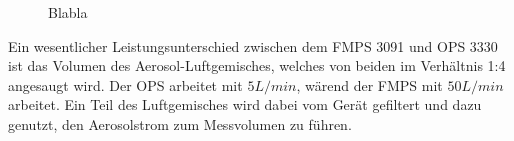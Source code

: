 \begin{figure}[H]
	\myfloatalign
	 \quad
	\caption[Blabla]
	{Blabla}
\end{figure}

Ein wesentlicher Leistungsunterschied zwischen dem FMPS 3091 und OPS 3330 ist das Volumen des Aerosol-Luftgemisches, welches von beiden im Verh\"{a}ltnis 1:4 angesaugt wird. Der OPS arbeitet mit $5 L/min$, w\"{a}rend der FMPS mit $50 L/min$ arbeitet. Ein Teil des Luftgemisches wird dabei vom Ger\"{a}t gefiltert und dazu genutzt, den Aerosolstrom zum Messvolumen zu f\"{u}hren.
